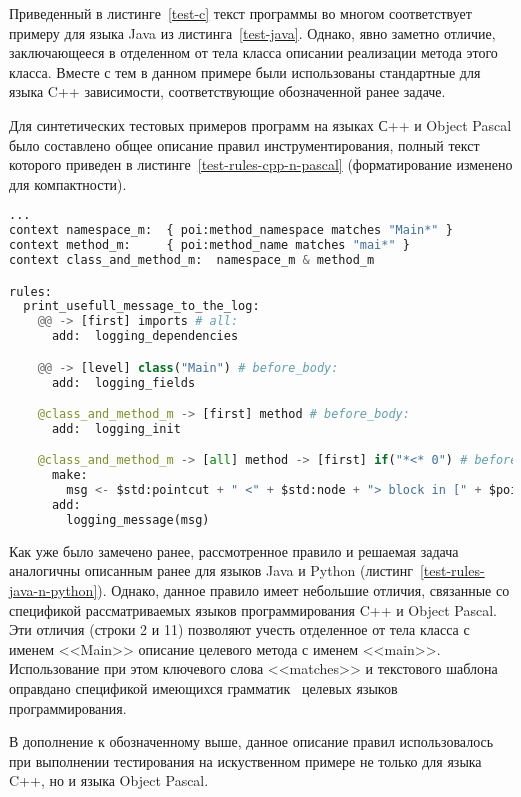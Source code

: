 Приведенный в листинге~\ref{test-c} текст программы во многом соответствует примеру для языка Java из листинга~\ref{test-java}.
Однако, явно заметно отличие, заключающееся в отделенном от тела класса описании реализации метода этого класса.
Вместе с тем в данном примере были использованы стандартные для языка C++ зависимости, соответствующие обозначенной ранее задаче.

Для синтетических тестовых примеров программ на языках С++ и Object Pascal было составлено общее описание правил инструментирования, полный текст которого приведен в листинге~\ref{test-rules-cpp-n-pascal} (форматирование изменено для компактности).

\begin{lstlisting}[frame=single, language=Python, label={test-rules-cpp-n-pascal}, caption={Описание правил инструментирования.}]
...
context namespace_m:  { poi:method_namespace matches "Main*" }
context method_m:     { poi:method_name matches "mai*" }
context class_and_method_m:  namespace_m & method_m

rules:
  print_usefull_message_to_the_log:
    @@ -> [first] imports # all:
      add:  logging_dependencies

    @@ -> [level] class("Main") # before_body:
      add:  logging_fields

    @class_and_method_m -> [first] method # before_body:
      add:  logging_init

    @class_and_method_m -> [all] method -> [first] if("*<* 0") # before:
      make:
        msg <- $std:pointcut + " <" + $std:node + "> block in [" + $poi:method_name_full + "] method";
      add:
        logging_message(msg)
\end{lstlisting}

Как уже было замечено ранее, рассмотренное правило и решаемая задача аналогичны описанным ранее для языков Java и Python (листинг~\ref{test-rules-java-n-python}).
Однако, данное правило имеет небольшие отличия, связанные со спецификой рассматриваемых языков программирования C++ и Object Pascal.
Эти отличия (строки 2 и 11) позволяют учесть отделенное от тела класса с именем <<Main>> описание целевого метода с именем <<main>>.
Использование при этом ключевого слова <<matches>> и текстового шаблона оправдано спецификой имеющихся грамматик~\cite{txl-resources} целевых языков программирования.

В дополнение к обозначенному выше, данное описание правил использовалось при выполнении тестирования на искуственном примере не только для языка C++, но и языка Object Pascal.

